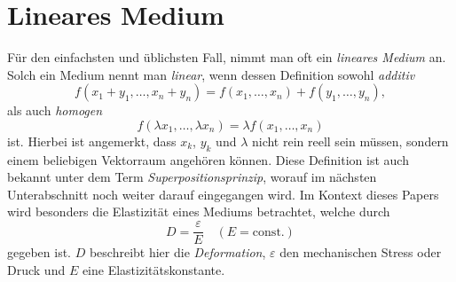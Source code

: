 %
%
%
%
\section{Lineares Medium\label{particles:section:linear}}
Für den einfachsten und üblichsten Fall, nimmt man oft ein \emph{lineares Medium} an.
Solch ein Medium nennt man \emph{linear}, wenn dessen Definition sowohl \emph{additiv}
\[
    f(x_{1} + y_{1}, \ldots, x_{n} + y_{n}) 
    = f(x_{1}, \ldots, x_{n}) + f(y_{1}, \ldots, y_{n}),
\]
als auch \emph{homogen}
\[
    f(\lambda x_{1}, \ldots, \lambda x_{n}) 
    = \lambda f(x_{1}, \ldots, x_{n})
\]
ist.
Hierbei ist angemerkt, dass $x_{k}$, $y_{k}$ und $\lambda$ nicht rein reell sein müssen, 
sondern einem beliebigen Vektorraum angehören können. %
Diese Definition ist auch bekannt unter dem Term \emph{Superpositionsprinzip}, 
worauf im nächsten Unterabschnitt noch weiter darauf eingegangen wird. %
Im Kontext dieses Papers wird besonders die Elastizität eines Mediums betrachtet, 
welche durch
\[
    D %
    = \frac{\varepsilon}{E}
    \quad
    (E = \text{const.})\label{particles:eq:lin-elastizitaet}
\]
gegeben ist. 
$D$ beschreibt hier die \emph{Deformation},
$\varepsilon$ den mechanischen Stress oder Druck und %
$E$ eine Elastizitätskonstante.


